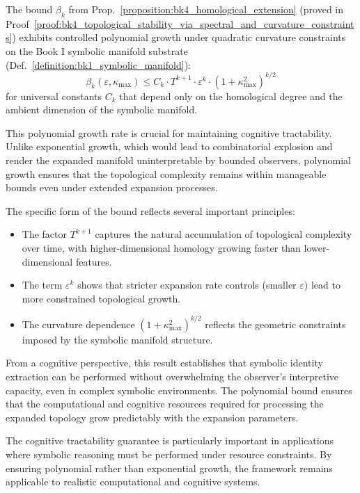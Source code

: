 \begin{remark}
\label{remark:bk4_betti_growth}
The bound $\beta_k$ from Prop.~\ref{proposition:bk4_homological_extension} (proved in Proof~\ref{proof:bk4_topological_stability_via_spectral_and_curvature_constraints}) exhibits controlled polynomial growth under quadratic curvature constraints on the Book I symbolic manifold substrate (Def.~\ref{definition:bk1_symbolic_manifold}):
\[
\beta_k(\varepsilon,\kappa_{\max}) \leq C_k \cdot T^{k+1} \cdot \varepsilon^k \cdot (1+\kappa_{\max}^2)^{k/2}
\]
for universal constants $C_k$ that depend only on the homological degree and the ambient dimension of the symbolic manifold.

This polynomial growth rate is crucial for maintaining cognitive tractability. Unlike exponential growth, which would lead to combinatorial explosion and render the expanded manifold uninterpretable by bounded observers, polynomial growth ensures that the topological complexity remains within manageable bounds even under extended expansion processes.

The specific form of the bound reflects several important principles:
\begin{itemize}
\item The factor $T^{k+1}$ captures the natural accumulation of topological complexity over time, with higher-dimensional homology growing faster than lower-dimensional features.
\item The term $\varepsilon^k$ shows that stricter expansion rate controls (smaller $\varepsilon$) lead to more constrained topological growth.
\item The curvature dependence $(1+\kappa_{\max}^2)^{k/2}$ reflects the geometric constraints imposed by the symbolic manifold structure.
\end{itemize}

From a cognitive perspective, this result establishes that symbolic identity extraction can be performed without overwhelming the observer's interpretive capacity, even in complex symbolic environments. The polynomial bound ensures that the computational and cognitive resources required for processing the expanded topology grow predictably with the expansion parameters.
\end{remark}

The cognitive tractability guarantee is particularly important in applications where symbolic reasoning must be performed under resource constraints. By ensuring polynomial rather than exponential growth, the framework remains applicable to realistic computational and cognitive systems.

